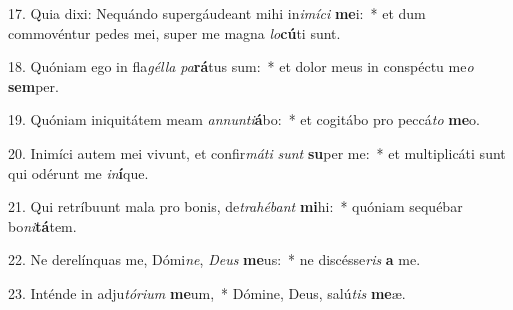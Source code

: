 17. Quia dixi: Nequándo supergáudeant mihi in\textit{i}\textit{mí}\textit{ci} \textbf{me}i:~*  et dum commovéntur pedes mei, super me magna \textit{lo}\textbf{cú}ti sunt.\

18. Quóniam ego in fla\textit{gél}\textit{la} \textit{pa}\textbf{rá}tus sum:~*  et dolor meus in conspéctu me\textit{o} \textbf{sem}per.\

19. Quóniam iniquitátem meam \textit{an}\textit{nun}\textit{ti}\textbf{á}bo:~*  et cogitábo pro peccá\textit{to} \textbf{me}o.\

20. Inimíci autem mei vivunt, et confir\textit{má}\textit{ti} \textit{sunt} \textbf{su}per me:~*  et multiplicáti sunt qui odérunt me \textit{in}\textbf{í}que.\

21. Qui retríbuunt mala pro bonis, de\textit{tra}\textit{hé}\textit{bant} \textbf{mi}hi:~*  quóniam sequébar bo\textit{ni}\textbf{tá}tem.\

22. Ne derelínquas me, Dómi\textit{ne}, \textit{De}\textit{us} \textbf{me}us:~*  ne discésse\textit{ris} \textbf{a} me.\

23. Inténde in adju\textit{tó}\textit{ri}\textit{um} \textbf{me}um,~*  Dómine, Deus, salú\textit{tis} \textbf{me}æ.\

